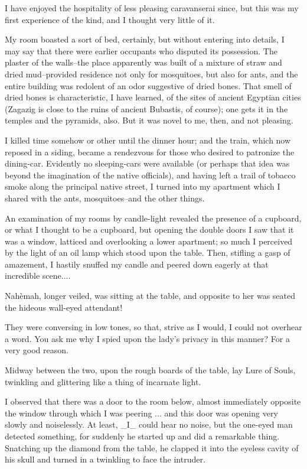 I have enjoyed the hospitality of less pleasing caravanserai since,
but this was my first experience of the kind, and I thought very
little of it.

My room boasted a sort of bed, certainly, but without entering into
details, I may say that there were earlier occupants who disputed its
possession. The plaster of the walls--the place apparently was built
of a mixture of straw and dried mud--provided residence not only for
mosquitoes, but also for ants, and the entire building was redolent
of an odor suggestive of dried bones. That smell of dried bones is
characteristic, I have learned, of the sites of ancient Egyptian
cities (Zagazig is close to the ruins of ancient Bubastis, of course);
one gets it in the temples and the pyramids, also. But it was novel to
me, then, and not pleasing.

I killed time somehow or other until the dinner hour; and the train,
which now reposed in a siding, became a rendezvous for those who
desired to patronize the dining-car. Evidently no sleeping-cars were
available (or perhaps that idea was beyond the imagination of the
native officials), and having left a trail of tobacco smoke along the
principal native street, I turned into my apartment which I shared
with the ants, mosquitoes--and the other things.

An examination of my rooms by candle-light revealed the presence of a
cupboard, or what I thought to be a cupboard, but opening the double
doors I saw that it was a window, latticed and overlooking a lower
apartment; so much I perceived by the light of an oil lamp which stood
upon the table. Then, stifling a gasp of amazement, I hastily snuffed
my candle and peered down eagerly at that incredible scene....

Nahèmah, longer veiled, was sitting at the table, and opposite to her
was seated the hideous wall-eyed attendant!

They were conversing in low tones, so that, strive as I would, I could
not overhear a word. You ask me why I spied upon the lady's privacy in
this manner? For a very good reason.

Midway between the two, upon the rough boards of the table, lay Lure
of Souls, twinkling and glittering like a thing of incarnate light.

I observed that there was a door to the room below, almost immediately
opposite the window through which I was peering ... and this door was
opening very slowly and noiselessly. At least, _I_ could hear no
noise, but the one-eyed man detected something, for suddenly he
started up and did a remarkable thing. Snatching up the diamond from
the table, he clapped it into the eyeless cavity of his skull and
turned in a twinkling to face the intruder.

